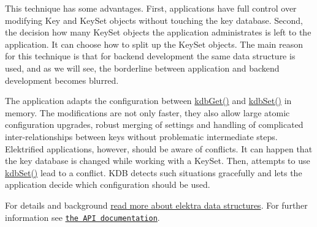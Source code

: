 This technique has some advantages. First, applications have full control over modifying {\ttfamily Key} and {\ttfamily Key\+Set} objects without touching the key database. Second, the decision how many {\ttfamily Key\+Set} objects the application administrates is left to the application. It can choose how to split up the {\ttfamily Key\+Set} objects. The main reason for this technique is that for backend development the same data structure is used, and as we will see, the borderline between application and backend development becomes blurred.

The application adapts the configuration between {\ttfamily \hyperlink{group__kdb_ga28e385fd9cb7ccfe0b2f1ed2f62453a1}{kdb\+Get()}} and {\ttfamily \hyperlink{group__kdb_ga11436b058408f83d303ca5e996832bcf}{kdb\+Set()}} in memory. The modifications are not only faster, they also allow large atomic configuration upgrades, robust merging of settings and handling of complicated inter-\/relationships between keys without problematic intermediate steps. Elektrified applications, however, should be aware of conflicts. It can happen that the key database is changed while working with a {\ttfamily Key\+Set}. Then, attempts to use {\ttfamily \hyperlink{group__kdb_ga11436b058408f83d303ca5e996832bcf}{kdb\+Set()}} lead to a conflict. {\ttfamily K\+DB} detects such situations gracefully and lets the application decide which configuration should be used.

For details and background \hyperlink{doc_dev_data-structures_md}{read more about elektra data structures}. For further information see \href{https://doc.libelektra.org/api/current/html/}{\tt the A\+PI documentation}. 